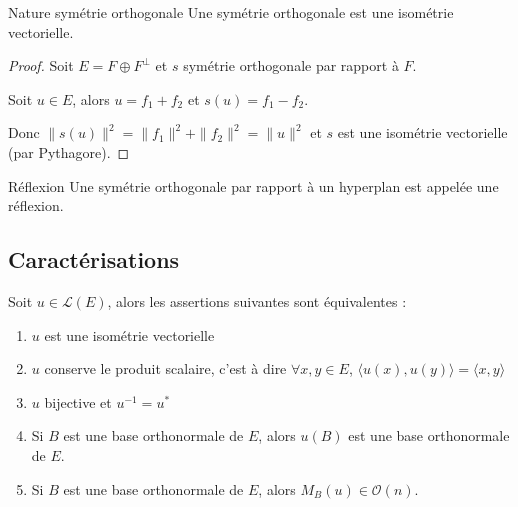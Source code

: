\begin{proposition}{Nature symétrie orthogonale}{}
    Une symétrie orthogonale est une isométrie vectorielle.
\end{proposition}


\begin{proof}
    Soit $E = F \oplus F^\perp$ et $s$ symétrie orthogonale par rapport à $F$. 

    Soit $u \in E$, alors $u = f_1 + f_2$ et $s(u) = f_1 - f_2$.

    Donc $\| s(u) \|^2 = \| f_1 \|^2 + \| f_2 \|^2 = \| u \|^2$ et $s$ est une isométrie vectorielle 
    (par Pythagore).
\end{proof}

\begin{definition}{Réflexion}{}
    Une symétrie orthogonale par rapport à un hyperplan est appelée une réflexion. 
\end{definition}

\subsection{Caractérisations}
\label{Caracterisation_isos}

\begin{theoreme}{}{}
    Soit $u \in \mathscr L(E)$, alors les assertions suivantes sont équivalentes :
    \begin{enumerate}
        \item $u$ est une isométrie vectorielle
        \item $u$ conserve le produit scalaire, c'est à dire 
        $\forall x, y \in E$, $\langle u(x), u(y) \rangle = \langle x, y \rangle$
        \item $u$ bijective et $u^{-1} = u^*$
        \item Si $B$ est une base orthonormale de $E$, alors $u(B)$ est une base orthonormale de $E$.
        \item Si $B$ est une base orthonormale de $E$, alors $M_B(u) \in \mathcal O(n)$.
    \end{enumerate}
\end{theoreme}


